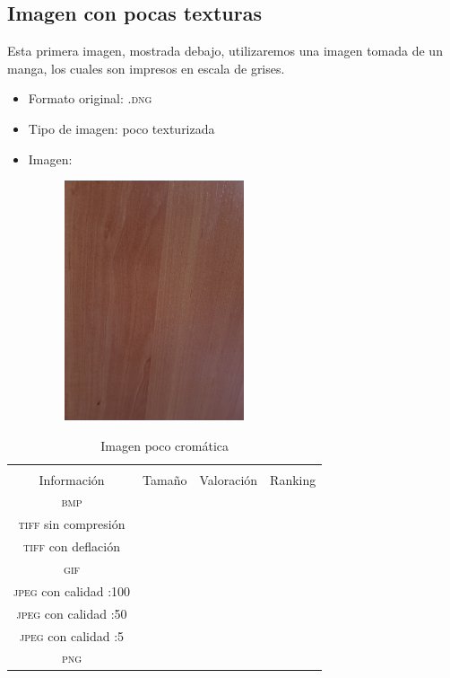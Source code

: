 \documentclass[11pt,a4paper]{article}
\begin{document}
\subsection{Imagen con pocas texturas}

Esta primera imagen, mostrada debajo, utilizaremos una imagen tomada de un manga, los cuales son impresos en escala de grises.

\begin{itemize}
	\item Formato original: \textsc{.dng}
	\item Tipo de imagen: poco texturizada
	\item Imagen:
		\begin{figure}[H]
		\centering
			\includegraphics[width=0.5\textwidth]{Fotos/pocas_texturas.jpg}
		\end{figure}	
\end{itemize}

\begin{table}[H]
\centering
\begin{tabular}{|c|c|c|c|}
\hline
\diagbox[width=15em]{\textit{Códec}/Formato}{\\Información} & Tamaño & Valoración & Ranking \\
\hline
\textsc{bmp} &  &  &  \\ \hline
\textsc{tiff} sin compresión &  &  &  \\ \hline
\textsc{tiff} con deflación &  &  &  \\ \hline
\textsc{gif} &  &  &  \\ \hline
\textsc{jpeg} con calidad :100 &  &  &  \\ \hline
\textsc{jpeg} con calidad :50 &  &  &  \\ \hline
\textsc{jpeg} con calidad :5 &  &  &  \\ \hline
\textsc{png} &  &  &  \\ \hline
\end{tabular}
\caption{Imagen poco cromática}
\label{tab:my-table}
\end{table}
\end{document}
